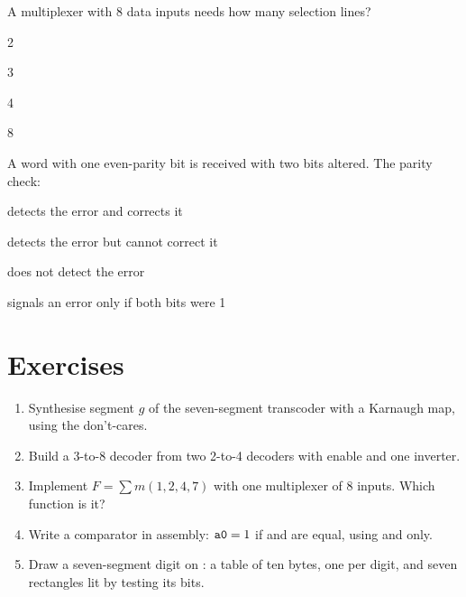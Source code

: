 \begin{quiz}{A multiplexer with 8 data inputs needs how many selection lines?}
\item 2
\item 3
\item 4
\item 8
\end{quiz}

\begin{quiz}{A word with one even-parity bit is received with two bits altered. The parity check:}
\item detects the error and corrects it
\item detects the error but cannot correct it
\item does not detect the error
\item signals an error only if both bits were 1
\end{quiz}

\section{Exercises}

\begin{exercise}
\begin{enumerate}[nosep]
\item Synthesise segment $g$ of the seven-segment transcoder with a Karnaugh
  map, using the don't-cares.
\item Build a 3-to-8 decoder from two 2-to-4 decoders with enable and one
  inverter.
\item Implement $F=\sum m(1,2,4,7)$ with one multiplexer of 8 inputs. Which
  function is it?
\item Write a comparator in assembly: $\texttt{a0}=1$ if  and 
  are equal, using  and  only.
\item Draw a seven-segment digit on \prg: a table of ten bytes, one per digit,
  and seven rectangles lit by testing its bits.
\end{enumerate}
\end{exercise}

